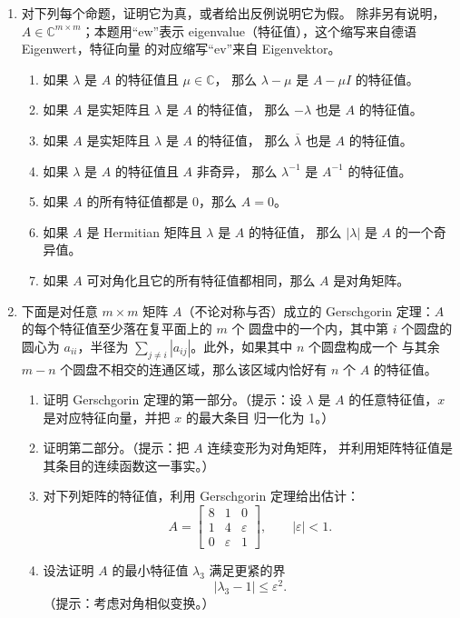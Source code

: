 \documentclass[UTF8,fontset=none,12pt]{ctexart}
\begin{document}
\begin{enumerate}[label=\textbf{24.\arabic*.},leftmargin=*]
    \item 对下列每个命题，证明它为真，或者给出反例说明它为假。
    除非另有说明，$A\in\mathbb{C}^{m\times m}$；本题用“ew”表示
    eigenvalue（特征值），这个缩写来自德语 Eigenwert，特征向量
    的对应缩写“ev”来自 Eigenvektor。
    \begin{enumerate}[label=(\alph*),leftmargin=2em]
        \item 如果 $\lambda$ 是 $A$ 的特征值且 $\mu\in\mathbb{C}$，
        那么 $\lambda-\mu$ 是 $A-\mu I$ 的特征值。
        \item 如果 $A$ 是实矩阵且 $\lambda$ 是 $A$ 的特征值，
        那么 $-\lambda$ 也是 $A$ 的特征值。
        \item 如果 $A$ 是实矩阵且 $\lambda$ 是 $A$ 的特征值，
        那么 $\overline{\lambda}$ 也是 $A$ 的特征值。
        \item 如果 $\lambda$ 是 $A$ 的特征值且 $A$ 非奇异，
        那么 $\lambda^{-1}$ 是 $A^{-1}$ 的特征值。
        \item 如果 $A$ 的所有特征值都是 0，那么 $A=0$。
        \item 如果 $A$ 是 Hermitian 矩阵且 $\lambda$ 是 $A$ 的特征值，
        那么 $|\lambda|$ 是 $A$ 的一个奇异值。
        \item 如果 $A$ 可对角化且它的所有特征值都相同，那么 $A$ 是对角矩阵。
    \end{enumerate}

    \item 下面是对任意 $m\times m$ 矩阵 $A$（不论对称与否）成立的
    Gerschgorin 定理：$A$ 的每个特征值至少落在复平面上的 $m$ 个
    圆盘中的一个内，其中第 $i$ 个圆盘的圆心为 $a_{ii}$，半径为
    $\sum_{j\ne i}|a_{ij}|$。此外，如果其中 $n$ 个圆盘构成一个
    与其余 $m-n$ 个圆盘不相交的连通区域，那么该区域内恰好有 $n$
    个 $A$ 的特征值。
    \begin{enumerate}[label=(\alph*),leftmargin=2em]
        \item 证明 Gerschgorin 定理的第一部分。（提示：设 $\lambda$
        是 $A$ 的任意特征值，$x$ 是对应特征向量，并把 $x$ 的最大条目
        归一化为 1。）
        \item 证明第二部分。（提示：把 $A$ 连续变形为对角矩阵，
        并利用矩阵特征值是其条目的连续函数这一事实。）
        \item 对下列矩阵的特征值，利用 Gerschgorin 定理给出估计：
        \[
        A=
        \begin{bmatrix}
        8&1&0\\
        1&4&\varepsilon\\
        0&\varepsilon&1
        \end{bmatrix},
        \qquad |\varepsilon|<1.
        \]
        \item 设法证明 $A$ 的最小特征值 $\lambda_3$ 满足更紧的界
        \[
        |\lambda_3-1|\le\varepsilon^2.
        \]
        （提示：考虑对角相似变换。）
    \end{enumerate}


\end{enumerate}
\end{document}
